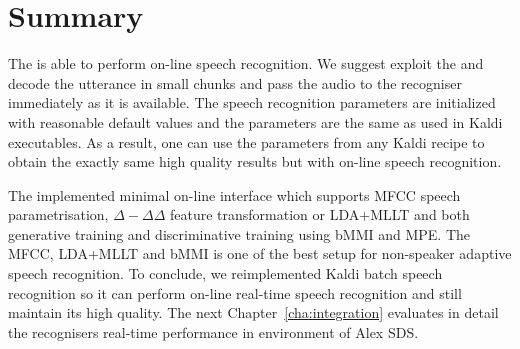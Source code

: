 \section{Summary}
\label{sec:onl_summary}
The  is able to perform on-line speech recognition.
We suggest exploit the  and decode the utterance in small chunks and pass the audio to the recogniser immediately as it is available.
The speech recognition parameters are initialized with reasonable default values and the parameters are the same as used in Kaldi executables. 
As a result, one can use the parameters from any Kaldi recipe to obtain the exactly same high quality results but with on-line speech recognition.

The implemented minimal on-line interface which supports \ac{MFCC} speech parametrisation, $\Delta-\Delta\Delta$ feature transformation or \ac{LDA}+\ac{MLLT} and both generative training and discriminative training using \ac{bMMI} and \ac{MPE}.
The \ac{MFCC}, \ac{LDA}+\ac{MLLT} and \ac{bMMI} is one of the best setup for non-speaker adaptive speech recognition.
To conclude, we reimplemented Kaldi batch speech recognition so it can perform on-line real-time speech recognition and still maintain its high quality.
The next Chapter~\ref{cha:integration} evaluates in detail the recognisers real-time performance in environment of Alex \ac{SDS}.
